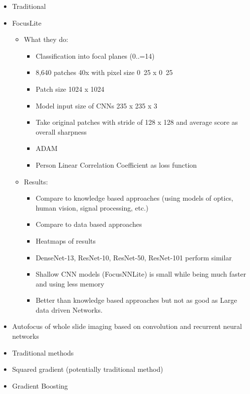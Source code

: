 \begin{itemize}
    \item Traditional \cite{mateos-perez2012comparative}
    \item FocusLite \cite{wang2020focuslitenn}
    \begin{itemize}
        \item What they do:
        \begin{itemize}
            \item Classification into focal planes (0..=14) 
            \item 8,640 patches
            40x with pixel size \unit{0.25}{\micro\meter} x \unit{0.25}{\micro\meter}  
            \item Patch size 1024 x 1024
            \item Model input size of CNNs 235 x 235 x 3
            \item Take original patches with stride of 128 x 128 and average score as overall sharpness
            \item ADAM
            \item Person Linear Correlation Coefficient as loss function
        \end{itemize}
        \item Results:
        \begin{itemize}
            \item Compare to knowledge based approaches (using models of optics, human vision, signal processing, etc.)
            \item Compare to data based approaches
            \item Heatmaps of results
            \item DenseNet-13, ResNet-10, ResNet-50, ResNet-101 perform similar
            \item Shallow CNN models (FocusNNLite) is small while being much faster and using less memory
            \item Better than knowledge based approaches but not as good as Large data driven Networks.
        \end{itemize}
    \end{itemize}
    \item Autofocus of whole slide imaging based on convolution and recurrent neural networks \cite{xiang2021autofocus}
    \item Traditional methods \cite{redondo2012autofocus}
    \item Squared gradient (potentially traditional method)
    \item Gradient Boosting \cite{liang2019learning}

\end{itemize}


